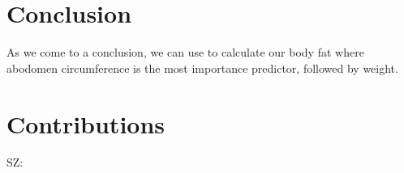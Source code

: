 \documentclass[11pt, letterpaper]{article}
\begin{document}
\section{Conclusion}
As we come to a conclusion, we can use  to calculate our body fat where abodomen circumference is the most importance predictor, followed by weight. 

\section{Contributions}
SZ:  


\pagebreak

{\small


}
\end{document}

